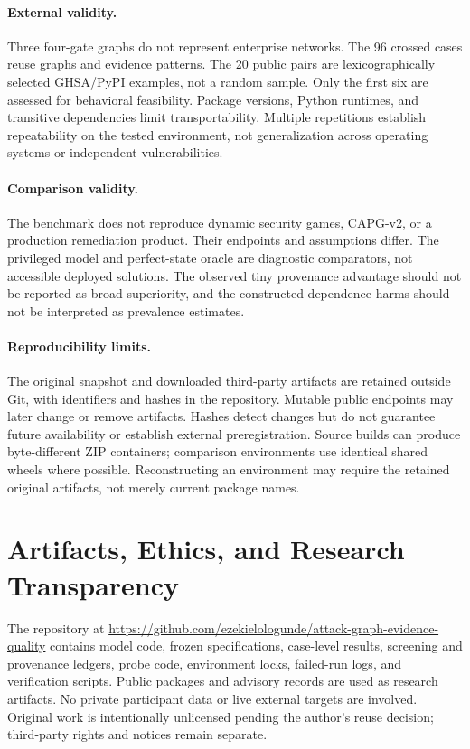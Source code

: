 \documentclass[manuscript,screen,nonacm]{acmart}
\begin{document}
\paragraph{External validity.} Three four-gate graphs do not represent enterprise networks. The 96 crossed cases reuse graphs and evidence patterns. The 20 public pairs are lexicographically selected GHSA/PyPI examples, not a random sample. Only the first six are assessed for behavioral feasibility. Package versions, Python runtimes, and transitive dependencies limit transportability. Multiple repetitions establish repeatability on the tested environment, not generalization across operating systems or independent vulnerabilities.

\paragraph{Comparison validity.} The benchmark does not reproduce dynamic security games, CAPG-v2, or a production remediation product. Their endpoints and assumptions differ. The privileged model and perfect-state oracle are diagnostic comparators, not accessible deployed solutions. The observed tiny provenance advantage should not be reported as broad superiority, and the constructed dependence harms should not be interpreted as prevalence estimates.

\paragraph{Reproducibility limits.} The original snapshot and downloaded third-party artifacts are retained outside Git, with identifiers and hashes in the repository. Mutable public endpoints may later change or remove artifacts. Hashes detect changes but do not guarantee future availability or establish external preregistration. Source builds can produce byte-different ZIP containers; comparison environments use identical shared wheels where possible. Reconstructing an environment may require the retained original artifacts, not merely current package names.

\section{Artifacts, Ethics, and Research Transparency}
The repository at \url{https://github.com/ezekielologunde/attack-graph-evidence-quality} contains model code, frozen specifications, case-level results, screening and provenance ledgers, probe code, environment locks, failed-run logs, and verification scripts. Public packages and advisory records are used as research artifacts. No private participant data or live external targets are involved. Original work is intentionally unlicensed pending the author's reuse decision; third-party rights and notices remain separate.
\end{document}
